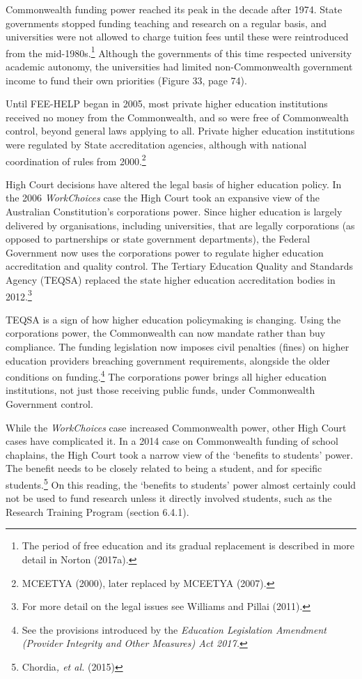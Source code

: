 \documentclass[]{book}
\begin{document}
Commonwealth funding power reached its peak in the decade after 1974. State governments stopped funding teaching and research on a regular basis, and universities were not allowed to charge tuition fees until these were reintroduced from the mid-1980s.\footnote{The period of free education and its gradual replacement is described in more detail in Norton (2017a).} Although the governments of this time respected university academic autonomy, the universities had limited non-Commonwealth government income to fund their own priorities (Figure 33, page 74).

Until FEE-HELP began in 2005, most private higher education institutions received no money from the Commonwealth, and so were free of Commonwealth control, beyond general laws applying to all. Private higher education institutions were regulated by State accreditation agencies, although with national coordination of rules from 2000.\footnote{MCEETYA (2000), later replaced by MCEETYA (2007).}

High Court decisions have altered the legal basis of higher education policy. In the 2006 \emph{WorkChoices} case the High Court took an expansive view of the Australian Constitution's corporations power. Since higher education is largely delivered by organisations, including universities, that are legally corporations (as opposed to partnerships or state government departments), the Federal Government now uses the corporations power to regulate higher education accreditation and quality control. The Tertiary Education Quality and Standards Agency (TEQSA) replaced the state higher education accreditation bodies in 2012.\footnote{For more detail on the legal issues see Williams and Pillai (2011).}

TEQSA is a sign of how higher education policymaking is changing. Using the corporations power, the Commonwealth can now mandate rather than buy compliance. The funding legislation now imposes civil penalties (fines) on higher education providers breaching government requirements, alongside the older conditions on funding.\footnote{See the provisions introduced by the \emph{Education Legislation Amendment (Provider Integrity and Other Measures) Act 2017.}} The corporations power brings all higher education institutions, not just those receiving public funds, under Commonwealth Government control.

While the \emph{WorkChoices} case increased Commonwealth power, other High Court cases have complicated it. In a 2014 case on Commonwealth funding of school chaplains, the High Court took a narrow view of the `benefits to students' power. The benefit needs to be closely related to being a student, and for specific students.\footnote{Chordia\emph{, et al.} (2015)} On this reading, the `benefits to students' power almost certainly could not be used to fund research unless it directly involved students, such as the Research Training Program (section 6.4.1).
\end{document}
